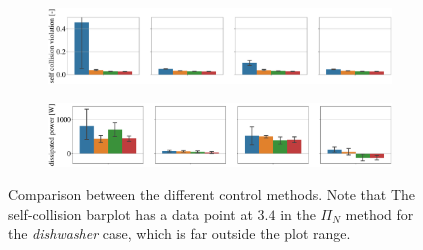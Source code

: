 \begin{figure}[t]
\begin{subfigure}{\columnwidth}
    \includegraphics[width=\linewidth]{figures/methods_comparison/self_collision.pdf}
\end{subfigure} %
\hspace*{-0.2cm} 
\vspace*{0.1cm}
\begin{subfigure}{\columnwidth}
    \includegraphics[width=\linewidth]{figures/methods_comparison/dissipated_power.pdf}
\end{subfigure}
\hfill
\caption{Comparison between the different control methods. Note that The self-collision barplot has a data point at $3.4$ in the $\Pi_{N}$ method for the \textit{dishwasher} case, which is far outside the plot range.}\label{fig:methods_comparison}
\end{figure}

\vspace{0.3cm}
